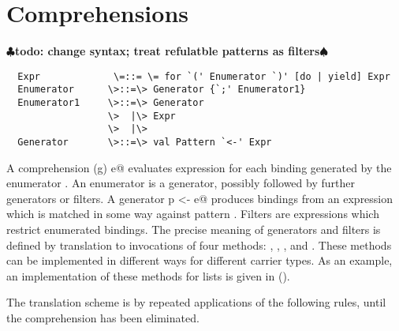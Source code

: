\documentclass[11pt]{report}
\renewcommand{\todo}[1]{{$\clubsuit$\bf todo: #1$\spadesuit$}}
\begin{document}
\section{Comprehensions}

\todo{change syntax; treat refulatble patterns as filters}

\syntax\begin{verbatim}
  Expr	           \=::= \= for `(' Enumerator `)' [do | yield] Expr
  Enumerator      \>::=\> Generator {`;' Enumerator1}
  Enumerator1     \>::=\> Generator
                  \>  |\> Expr
                  \>  |\>
  Generator       \>::=\> val Pattern `<-' Expr
\end{verbatim}

A comprehension \verb@for (g) e@ evaluates expression \verb@e@ for each
binding generated by the enumerator \verb@g@. An enumerator is a generator,
possibly followed by further generators or filters.  A generator
\verb@val p <- e@ produces bindings from an expression \verb@e@ which is
matched in some way against pattern \verb@p@. Filters are expressions which
restrict enumerated bindings. The precise meaning of generators and
filters is defined by translation to invocations of four methods:
\verb@map@, \verb@filter@, \verb@flatMap@, and \verb@foreach@. These
methods can be implemented in different ways for different carrier
types.  As an example, an implementation of these methods for lists is
given in ().

The translation scheme is by repeated applications of the following
rules, until the comprehension has been eliminated.
\end{document}
